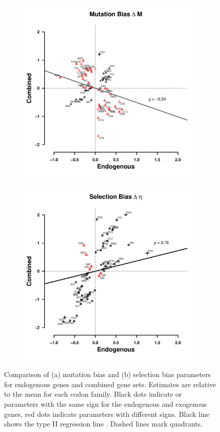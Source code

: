 \documentclass[fleqn,letterpaper]{article}
\begin{document}
\begin{figure}
    \centering
    \begin{subfigure}
        \centering
        \includegraphics[width=.45\textwidth]{img/csp_corr_dm_full.pdf}
    \end{subfigure}
    \begin{subfigure}
        \centering
        \includegraphics[width=.45\textwidth]{img/csp_corr_deta_full.pdf}
    \end{subfigure}
    \caption{Comparison of (a) mutation bias \DM and (b) selection bias \DE parameters for endogenous genes and combined gene sets.
      Estimates are relative to the mean for each codon family.
      Black dots indicate \DM or \DE parameters with the same sign for the endogenous and exogenous genes, red dots indicate parameters with different signs.
      Black line shows the type II regression line \citep{SokalAndRohlf1981}.
      Dashed lines mark quadrants.}
    \label{fig:csp_end_comb}
\end{figure}
\null
\vfill
\clearpage
\end{document}
